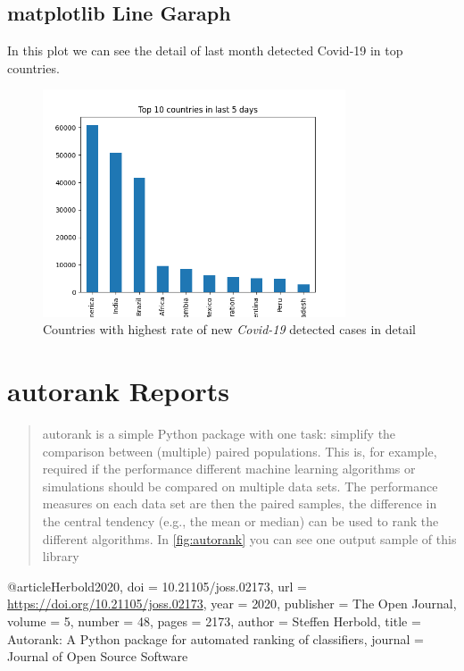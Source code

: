 \documentclass[12pt, letterpaper, twoside]{report}
\begin{document}
\section{matplotlib Line Garaph} 
 In this plot we can see the detail of last month detected Covid-19 in top countries.
\begin{figure}[ht]
    \centering
    \includegraphics[width=0.8\textwidth]{TopCountries.png}
    \caption{Countries with highest rate of new \textit{Covid-19} detected cases in detail}
    \label{fig:TopCountries}
\end{figure}

\chapter{autorank Reports}
 

 \begin{abstract}
  autorank is a simple Python package with one task: simplify the comparison between (multiple) paired populations. This is, for example, required if the performance different machine learning algorithms or simulations should be compared on multiple data sets. The performance measures on each data set are then the paired samples, the difference in the central tendency (e.g., the mean or median) can be used to rank the different algorithms. In \ref{fig:autorank} you can see one output sample of this library
 \end{abstract}

\begin{thebibliography}{9}
@article{Herbold2020,
  doi = {10.21105/joss.02173},
  url = {\url{https://doi.org/10.21105/joss.02173}},
  year = {2020},
  publisher = {The Open Journal},
  volume = {5},
  number = {48},
  pages = {2173},
  author = {Steffen Herbold},
  title = {Autorank: A Python package for 
  automated ranking of classifiers},
  journal = {Journal of Open Source Software}}
\end{thebibliography}

 
\end{document}
